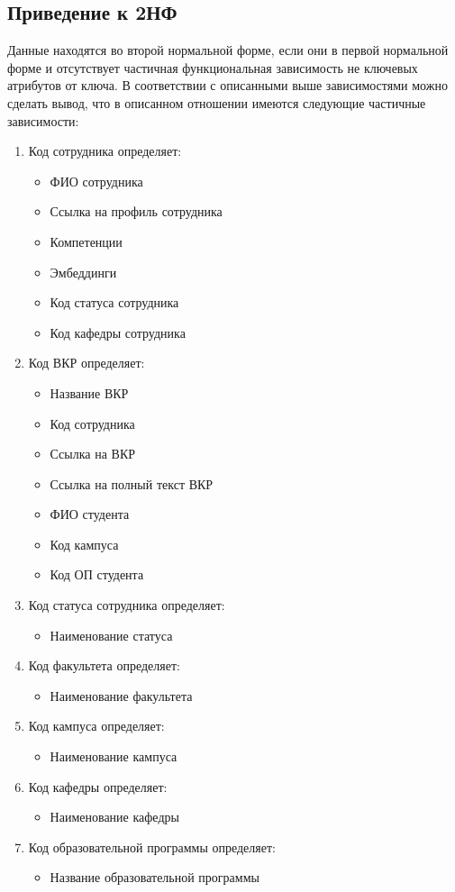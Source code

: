 \documentclass[PI,KR]{HSEUniversity}
\begin{document}
\subsection{Приведение к 2НФ}
Данные находятся во второй нормальной форме, если они в первой нормальной форме и отсутствует частичная функциональная зависимость не ключевых атрибутов от ключа.
В соответствии с описанными выше зависимостями можно сделать вывод, что в описанном отношении имеются следующие частичные зависимости:
\begin{enumerate}
	\item Код сотрудника определяет:
	\begin{itemize}
		\item ФИО сотрудника
		\item Ссылка на профиль сотрудника
		\item Компетенции
		\item Эмбеддинги
		\item Код статуса сотрудника
		\item Код кафедры сотрудника
	\end{itemize}
	\item Код ВКР определяет:
	\begin{itemize}
		\item Название ВКР
		\item Код сотрудника
		\item Ссылка на ВКР
		\item Ссылка на полный текст ВКР
		\item ФИО студента
		\item Код кампуса
		\item Код ОП студента
	\end{itemize}
	\item Код статуса сотрудника определяет:
	\begin{itemize}
		\item Наименование статуса
	\end{itemize}
	\item Код факультета определяет:
	\begin{itemize}
		\item Наименование факультета
	\end{itemize}
	\item Код кампуса определяет:
	\begin{itemize}
		\item Наименование кампуса
	\end{itemize}
	\item Код кафедры определяет:
	\begin{itemize}
		\item Наименование кафедры
	\end{itemize}
	\item Код образовательной программы определяет:
	\begin{itemize}
		\item Название образовательной программы
	\end{itemize}
\end{enumerate}
\end{document}
